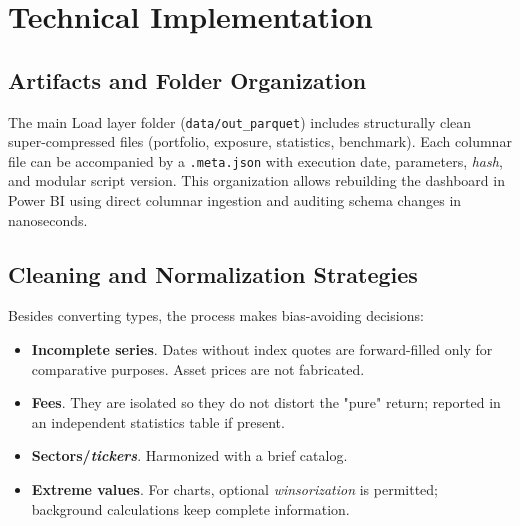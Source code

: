 \documentclass[conference]{IEEEtran}
\begin{document}
\section{Technical Implementation}
\subsection{Artifacts and Folder Organization}
The main Load layer folder (\texttt{data/out\_parquet}) includes structurally clean super-compressed files (portfolio, exposure, statistics, benchmark). Each columnar file can be accompanied by a \texttt{.meta.json} with execution date, parameters, \emph{hash}, and modular script version. This organization allows rebuilding the dashboard in Power BI using direct columnar ingestion and auditing schema changes in nanoseconds.

\subsection{Cleaning and Normalization Strategies}
Besides converting types, the process makes bias-avoiding decisions:
\begin{itemize}
  \item \textbf{Incomplete series}. Dates without index quotes are forward-filled only for comparative purposes. Asset prices are not fabricated.
  \item \textbf{Fees}. They are isolated so they do not distort the "pure" return; reported in an independent statistics table if present.
  \item \textbf{Sectors/\emph{tickers}}. Harmonized with a brief catalog.
  \item \textbf{Extreme values}. For charts, optional \emph{winsorization} is permitted; background calculations keep complete information.
\end{itemize}
\end{document}
